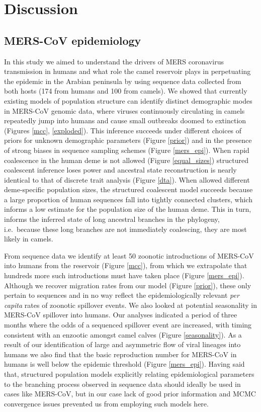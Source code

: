 \documentclass[9pt,lineno]{elife}
\def\lmc#1{\textcolor{green}{[#1]}}
\begin{document}
\section*{Discussion}

\subsection*{MERS-CoV epidemiology}
In this study we aimed to understand the drivers of MERS coronavirus transmission in humans and what role the camel reservoir plays in perpetuating the epidemic in the Arabian peninsula by using sequence data collected from both hosts (174 from humans and 100 from camels).
We showed that currently existing models of population structure \citep{vaughan_efficient_2014} can identify distinct demographic modes in MERS-CoV genomic data, where viruses continuously circulating in camels repeatedly jump into humans and cause small outbreaks doomed to extinction (Figures \ref{mcc}, \ref{exploded}).
This inference succeeds under different choices of priors for unknown demographic parameters (Figure \ref{prior}) and in the presence of strong biases in sequence sampling schemes (Figure \ref{mers_epi}).
When rapid coalescence in the human deme is not allowed (Figure \ref{equal_sizes}) structured coalescent inference loses power and ancestral state reconstruction is nearly identical to that of discrete trait analysis (Figure \ref{dta}).
When allowed different deme-specific population sizes, the structured coalescent model succeeds because a large proportion of human sequences fall into tightly connected clusters, which informs a low estimate for the population size of the human deme.
This in turn, informs the inferred state of long ancestral branches in the phylogeny, i.e.\ because these long branches are not immediately coalescing, they are most likely in camels.

From sequence data we identify at least 50 zoonotic introductions of MERS-CoV into humans from the reservoir (Figure \ref{mcc}), from which we extrapolate that hundreds more such introductions must have taken place (Figure \ref{mers_epi}).
Although we recover migration rates from our model (Figure \ref{prior}), these only pertain to sequences and in no way reflect the epidemiologically relevant \textit{per capita} rates of zoonotic spillover events.
We also looked at potential seasonality in MERS-CoV spillover into humans.
Our analyses indicated a period of three months where the odds of a sequenced spillover event are increased, with timing consistent with an enzootic amongst camel calves (Figure \ref{seasonality}).
As a result of our identification of large and asymmetric flow of viral lineages into humans we also find that the basic reproduction number for MERS-CoV in humans is well below the epidemic threshold (Figure \ref{mers_epi}).
Having said that, structured population models explicitly relating epidemiological parameters to the branching process observed in sequence data \citep{kuhnert_phylodynamics_2016} should ideally be used in cases like MERS-CoV, but in our case lack of good prior information and MCMC convergence issues prevented us from employing such models here.
\end{document}
